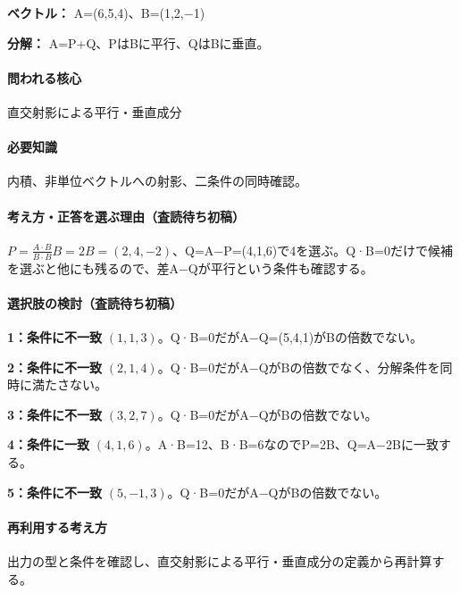 \noindent\textbf{ベクトル：} A=\allowbreak{}(6,5,4)、B=\allowbreak{}(1,2,−1)\par

\noindent\textbf{分解：} A=\allowbreak{}P+Q、PはBに平行、QはBに垂直。\par

\paragraph{問われる核心} 直交射影による平行・垂直成分

\paragraph{必要知識} 内積、非単位ベクトルへの射影、二条件の同時確認。

\paragraph{考え方・正答を選ぶ理由（査読待ち初稿）} \(P=\frac{A\cdot B}{B\cdot B}B=2B=(2,4,-2)\)、Q=\allowbreak{}A−P=\allowbreak{}(4,1,6)で4を選ぶ。Q·B=\allowbreak{}0だけで候補を選ぶと他にも残るので、差A−Qが平行という条件も確認する。

\paragraph{選択肢の検討（査読待ち初稿）}\mbox{}\par

\noindent\textbf{1：条件に不一致} \((1,1,3)\)。Q·B=\allowbreak{}0だがA−Q=\allowbreak{}(5,4,1)がBの倍数でない。\par

\noindent\textbf{2：条件に不一致} \((2,1,4)\)。Q·B=\allowbreak{}0だがA−QがBの倍数でなく、分解条件を同時に満たさない。\par

\noindent\textbf{3：条件に不一致} \((3,2,7)\)。Q·B=\allowbreak{}0だがA−QがBの倍数でない。\par

\noindent\textbf{4：条件に一致} \((4,1,6)\)。A·B=\allowbreak{}12、B·B=\allowbreak{}6なのでP=\allowbreak{}2B、Q=\allowbreak{}A−2Bに一致する。\par

\noindent\textbf{5：条件に不一致} \((5,-1,3)\)。Q·B=\allowbreak{}0だがA−QがBの倍数でない。\par

\paragraph{再利用する考え方} 出力の型と条件を確認し、直交射影による平行・垂直成分の定義から再計算する。

